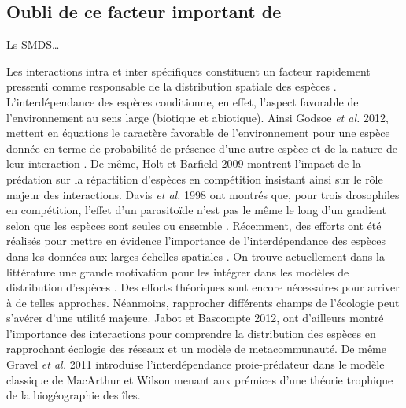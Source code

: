 \subsection{Oubli de ce facteur important
de}\label{oubli-de-ce-facteur-important-de}

Ls SMDS\ldots{}

Les interactions intra et inter spécifiques constituent un facteur
rapidement pressenti comme responsable de la distribution spatiale des
espèces \cite{Levin1974}. L'interdépendance des espèces conditionne, en
effet, l'aspect favorable de l'environnement au sens large (biotique et
abiotique). Ainsi Godsoe \textit{et al.} 2012, mettent en équations le
caractère favorable de l'environnement pour une espèce donnée en terme
de probabilité de présence d'une autre espèce et de la nature de leur
interaction \cite{Godsoe2012}. De même, Holt et Barfield 2009 montrent
l'impact de la prédation sur la répartition d'espèces en compétition
\cite{Holt2009} insistant ainsi sur le rôle majeur des interactions.
Davis \textit{et al.} 1998 ont montrés que, pour trois drosophiles en
compétition, l'effet d'un parasitoïde n'est pas le même le long d'un
gradient selon que les espèces sont seules ou ensemble \cite{Davis1998}.
Récemment, des efforts ont été réalisés pour mettre en évidence
l'importance de l'interdépendance des espèces dans les données aux
larges échelles spatiales \cite{Gotelli2010}. On trouve actuellement
dans la littérature une grande motivation pour les intégrer dans les
modèles de distribution d'espèces \cite{Kissling2011, Guisan2011}. Des
efforts théoriques sont encore nécessaires pour arriver à de telles
approches. Néanmoins, rapprocher différents champs de l'écologie peut
s'avérer d'une utilité majeure. Jabot et Bascompte \cite{Jabot2012}
2012, ont d'ailleurs montré l'importance des interactions pour
comprendre la distribution des espèces en rapprochant écologie des
réseaux et un modèle de metacommunauté. De même Gravel \textit{et al.}
2011 \cite{Gravel2011b} introduise l'interdépendance proie-prédateur
dans le modèle classique de MacArthur et Wilson menant aux prémices
d'une théorie trophique de la biogéographie des îles.

